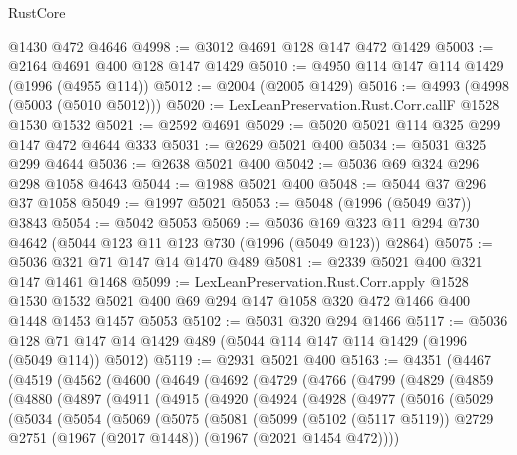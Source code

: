 \begin{lexlean}{RustCore}
\begin{coremodule}
    @1430
    @472
    @4646
@4998 := @3012 @4691 @128 @147 @472 @1429
@5003 := @2164 @4691 @400 @128 @147 @1429
@5010 := @4950 @114 @147 @114 @1429 (@1996 (@4955 @114))
@5012 := @2004 (@2005 @1429)
@5016 := @4993 (@4998 (@5003 (@5010 @5012)))
@5020 := LexLeanPreservation.Rust.Corr.callF @1528 @1530 @1532
@5021 := @2592 @4691
@5029 := @5020 @5021 @114 @325 @299 @147 @472 @4644 @333
@5031 := @2629 @5021 @400
@5034 := @5031 @325 @299 @4644
@5036 := @2638 @5021 @400
@5042 := @5036 @69 @324 @296 @298 @1058 @4643
@5044 := @1988 @5021 @400
@5048 := @5044 @37 @296 @37 @1058
@5049 := @1997 @5021
@5053 := @5048 (@1996 (@5049 @37)) @3843
@5054 := @5042 @5053
@5069 := @5036 @169 @323 @11 @294 @730 @4642 (@5044 @123 @11 @123 @730 (@1996 (@5049 @123)) @2864)
@5075 := @5036 @321 @71 @147 @14 @1470 @489
@5081 := @2339 @5021 @400 @321 @147 @1461 @1468
@5099 := LexLeanPreservation.Rust.Corr.apply
    @1528
    @1530
    @1532
    @5021
    @400
    @69
    @294
    @147
    @1058
    @320
    @472
    @1466
    @400
    @1448
    @1453
    @1457
    @5053
@5102 := @5031 @320 @294 @1466
@5117 := @5036 @128 @71 @147 @14 @1429 @489 (@5044 @114 @147 @114 @1429 (@1996 (@5049 @114)) @5012)
@5119 := @2931 @5021 @400
@5163 := @4351
    (@4467
      (@4519
        (@4562
          (@4600
            (@4649
              (@4692
                (@4729
                  (@4766
                    (@4799
                      (@4829
                        (@4859
                          (@4880
                            (@4897
                              (@4911
                                (@4915
                                  (@4920
                                    (@4924
                                      (@4928
                                        (@4977
                                          (@5016
                                            (@5029
                                              (@5034
                                                (@5054
                                                  (@5069
                                                    (@5075
                                                      (@5081
                                                        (@5099
                                                          (@5102 (@5117 @5119))
                                                          @2729
                                                          @2751
                                                          (@1967 (@2017 @1448))
                                                          (@1967 (@2021 @1454 @472))))

\end{coremodule}
\end{lexlean}
